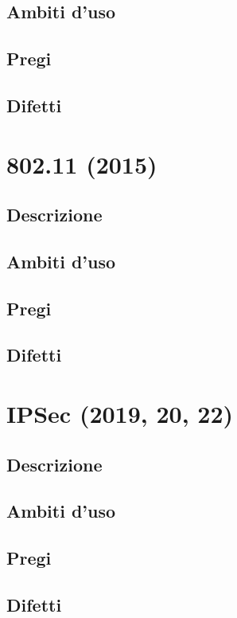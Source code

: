 \documentclass[10pt,oneside,a4paper]{article}
\begin{document}
\subsection{Ambiti d'uso}
\subsection{Pregi}
\subsection{Difetti}
\section{802.11 (2015)}
\subsection{Descrizione}
\subsection{Ambiti d'uso}
\subsection{Pregi}
\subsection{Difetti}
\section{IPSec (2019, 20, 22)}
\subsection{Descrizione}
\subsection{Ambiti d'uso}
\subsection{Pregi}
\subsection{Difetti}
\end{document}

